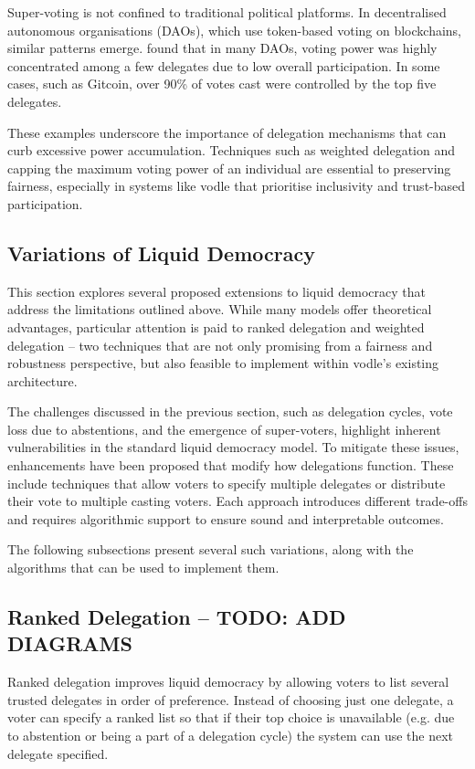 Super-voting is not confined to traditional political platforms. In decentralised autonomous organisations (DAOs), which use token-based voting on blockchains, similar patterns emerge. \citet{hallWhatHappensWhen2024} found that in many DAOs, voting power was highly concentrated among a few delegates due to low overall participation. In some cases, such as Gitcoin, over 90\% of votes cast were controlled by the top five delegates.

These examples underscore the importance of delegation mechanisms that can curb excessive power accumulation. Techniques such as weighted delegation and capping the maximum voting power of an individual are essential to preserving fairness, especially in systems like vodle that prioritise inclusivity and trust-based participation.

\subsection{Variations of Liquid Democracy}
This section explores several proposed extensions to liquid democracy that address the limitations outlined above. While many models offer theoretical advantages, particular attention is paid to ranked delegation and weighted delegation -- two techniques that are not only promising from a fairness and robustness perspective, but also feasible to implement within vodle's existing architecture.

The challenges discussed in the previous section, such as delegation cycles, vote loss due to abstentions, and the emergence of super-voters, highlight inherent vulnerabilities in the standard liquid democracy model. To mitigate these issues, enhancements have been proposed that modify how delegations function. These include techniques that allow voters to specify multiple delegates or distribute their vote to multiple casting voters. Each approach introduces different trade-offs and requires algorithmic support to ensure sound and interpretable outcomes.

The following subsections present several such variations, along with the algorithms that can be used to implement them.
\subsection*{Ranked Delegation -- TODO: ADD DIAGRAMS}\label{subsec:background_ranked_delegation}
Ranked delegation improves liquid democracy by allowing voters to list several trusted delegates in order of preference. Instead of choosing just one delegate, a voter can specify a ranked list so that if their top choice is unavailable (e.g. due to abstention or being a part of a delegation cycle) the system can use the next delegate specified.

